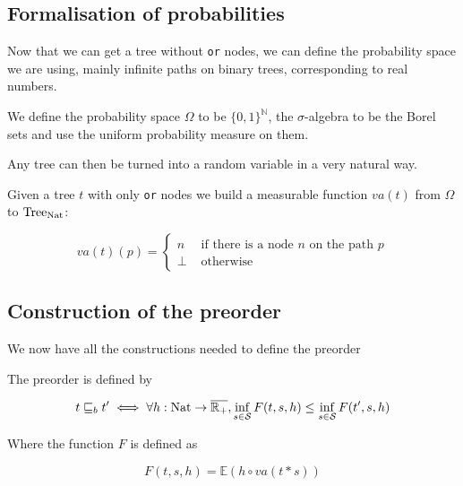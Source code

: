\subsection{Formalisation of probabilities}

Now that we can get a tree without \texttt{or} nodes,
we can define the probability space we are using, mainly 
infinite paths on binary trees, corresponding to real numbers.

\begin{adefinition}
    We define the probability space $\Omega$
    to be $\{0,1\}^\mathbb{N}$, the 
    $\sigma$-algebra to be the Borel sets 
    and use the uniform probability measure on them.
\end{adefinition}

Any tree can then be turned into a random variable in 
a very natural way. 

\begin{adefinition}
    Given a tree $t$ with only \texttt{or} nodes we 
    build a measurable function $va(t)$ from $\Omega$ to $\textnormal{Tree}_{\textnormal{Nat}}$:

    \begin{equation*}
        va(t)(p) = \begin{cases}
            n  & \text{ if there is a node } n \text{ on the path } p \\
            \bot & \text{ otherwise } 
        \end{cases}
    \end{equation*}
\end{adefinition}


\subsection{Construction of the preorder}

We now have all the constructions needed to define the preorder

\begin{adefinition}[Preorder]
    The preorder is defined by

    \begin{equation*}
        t \sqsubseteq_b t' \iff \forall h : \textnormal{Nat} \to \overline{\mathbb{R}_+}, 
        \inf_{ s \in \mathcal{S}} F (t,s,h) \leq \inf_{s \in \mathcal{S}} F (t',s,h)
    \end{equation*}

    Where the function $F$ is defined as 

    \begin{equation*}
        F(t,s,h) = \mathbb{E}(h \circ va(t * s))
    \end{equation*}
\end{adefinition}


